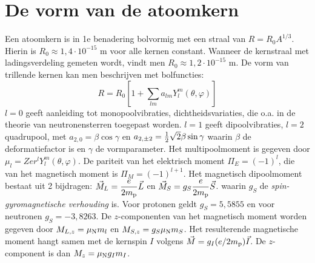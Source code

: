 \documentclass[twoside]{report}
\begin{document}
\section{De vorm van de atoomkern}
Een atoomkern is in 1e benadering bolvormig met een straal van $R=R_0A^{1/3}$.
Hierin is $R_0\approx1,4\cdot10^{-15}$ m voor alle kernen constant. Wanneer
de kernstraal met ladingsverdeling gemeten wordt, vindt men
$R_0\approx1,2\cdot10^{-15}$ m. De vorm van trillende kernen kan men
beschrijven met bolfuncties:
\[
R=R_0\left[1+\sum_{lm}a_{lm}Y_l^m(\theta,\varphi)\right]
\]
$l=0$ geeft aanleiding tot monopoolvibraties, dichtheidsvariaties, die o.a.
in de theorie van neutronensterren toegepast worden. $l=1$ geeft
dipoolvibraties, $l=2$ quadrupool, met $a_{2,0}=\beta\cos\gamma$ en
$a_{2,\pm2}=\mbox{$\frac{1}{2}$}\sqrt{2}\beta\sin\gamma$ waarin $\beta$ de deformatiefactor
is en $\gamma$ de vormparameter. Het multipoolmoment is gegeven door
$\mu_l=Zer^lY_l^m(\theta,\varphi)$. De pariteit van het elektrisch moment
$\Pi_E=(-1)^l$, die van het magnetisch moment is $\Pi_M=(-1)^{l+1}$.
\npar
Het magnetisch dipoolmoment bestaat uit 2 bijdragen:
$\displaystyle\vec{M}_L=\frac{e}{2m_{\rm p}}\vec{L}$ en
$\displaystyle\vec{M}_S=g_S\frac{e}{2m_{\rm p}}\vec{S}$.
\npar
waarin $g_S$ de {\it spin-gyromagnetische verhouding} is. Voor protonen geldt
$g_S=5,5855$ en voor neutronen $g_S=-3,8263$. De $z$-componenten van het
magnetisch moment worden gegeven door $M_{L,z}=\mu_{\rm N}m_l$ en
$M_{S,z}=g_S\mu_{\rm N}m_S$. Het resulterende magnetische moment hangt samen
met de kernspin $I$ volgens $\vec{M}=g_I(e/2m_{\rm p})\vec{I}$. De
$z$-component is dan $M_z=\mu_{\rm N}g_Im_I$.
\end{document}

